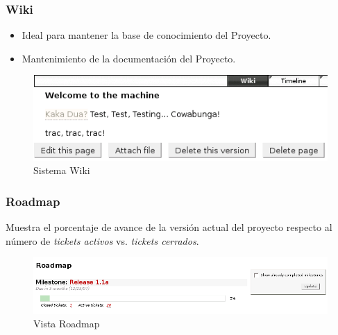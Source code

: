 \documentclass{beamer}
\begin{document}
\begin{frame}
    \frametitle{Wiki}

    \begin{itemize}
        \item
            Ideal para mantener la base de conocimiento del Proyecto.
        \item
            Mantenimiento de la documentación del Proyecto.
    \end{itemize}

    \begin{figure}
        \includegraphics[scale=0.3]{pix/wiki}
        \caption{Sistema Wiki}
    \end{figure}

\end{frame}


\begin{frame}
    \frametitle{Roadmap}

    Muestra el porcentaje de avance de la versión actual del proyecto respecto al número de \emph{tickets activos} vs. \emph{tickets cerrados}.
    
    \begin{figure}
        \includegraphics[scale=0.3]{pix/roadmap}
        \caption{Vista Roadmap}
    \end{figure}
\end{frame}
\end{document}
